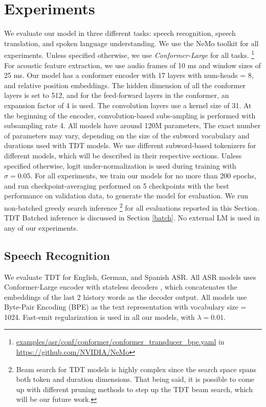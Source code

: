 \documentclass{article}
\begin{document}
\section{Experiments}\label{results}
We evaluate our model in three different tasks: speech recognition, speech translation, and spoken language understanding.
We use the NeMo \cite{kuchaiev2019nemo} toolkit for all experiments. Unless  specified otherwise, we use \emph{Conformer-Large} for all tasks. \footnote{\url{examples/asr/conf/conformer/conformer_transducer_bpe.yaml} in \url{https://github.com/NVIDIA/NeMo}} 
For acoustic feature extraction, we use audio frames of 10 ms and window sizes of 25 ms.
Our model has a conformer encoder with 17 layers with num-heads = 8, and relative position embeddings. The hidden dimension of all the conformer layers is set to 512, and for the feed-forward layers in the conformer, an expansion factor of 4 is used. The convolution layers use a kernel size of 31. At the beginning of the encoder,  convolution-based subs-ampling is performed  with subsampling rate 4.
All models have around 120M parameters, The exact number of parameters may vary, depending on the size of the subword vocabulary and durations used with TDT models.
We use different subword-based tokenizers  for different models, which will be described in their respective sections. 
Unless specified otherwise, logit under-normalization is used during training with $\sigma = 0.05$.
For all experiments, we train our models for no more than 200 epochs, and run checkpoint-averaging performed on 5 checkpoints with the best performance on validation data, to generate the model for evaluation. We run non-batched greedy search inference \footnote{Beam search for TDT models is highly complex since the search space spans both token and duration dimensions. That being said, it is possible to come up with different pruning methods to step up the TDT beam search, which will be our future work.}  for all evaluations reported in this Section. TDT Batched inference is discussed in Section \ref{batch}. No external LM is used in any of our experiments.

\subsection{Speech Recognition}
We evaluate TDT for  English, German, and Spanish ASR. 
All ASR models uses Conformer-Large encoder with stateless decoders \cite{Ghodsi2020stateless}, which  concatenates the embeddings of the last 2 history words as
the decoder output. 
All models use Byte-Pair Encoding (BPE) \cite{sennrich2015neural} as the text representation with vocabulary size = 1024.  Fast-emit \cite{yu2021fastemit} regularization is used in all our models, with $\lambda = 0.01$.
\end{document}

